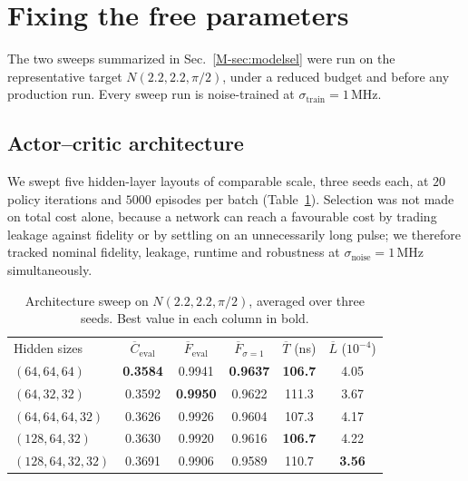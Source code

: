 \documentclass[aps,prx,twocolumn,superscriptaddress,nofootinbib,amsmath,amssymb,floatfix]{revtex4-2}
\newcommand{\Ntgt}[2]{N(#1,#1,#2)}
\newcommand{\Fbar}{\overline{F}}
\newcommand{\snoise}{\sigma_{\mathrm{noise}}}
\newcommand{\strain}{\sigma_{\mathrm{train}}}
\newcommand{\MHz}{\,\mathrm{MHz}}
\begin{document}
\section{Fixing the free parameters}
\label{app:modelsel}

The two sweeps summarized in Sec.~\ref{M-sec:modelsel} were run on the representative target
$\Ntgt{2.2}{\pi/2}$, under a reduced budget and before any production run. Every sweep run is
noise-trained at $\strain=1\MHz$.

\subsection{Actor--critic architecture}
\label{sec:arch}

We swept five hidden-layer layouts of comparable scale, three seeds each, at $20$ policy iterations and
$5000$ episodes per batch (Table~\ref{tab:arch}). Selection was not made on total cost alone, because
a network can reach a favourable cost by trading leakage against fidelity or by settling on an
unnecessarily long pulse; we therefore tracked nominal fidelity, leakage, runtime and robustness at
$\snoise=1\MHz$ simultaneously.

\begin{table}[t]
\caption{Architecture sweep on $\Ntgt{2.2}{\pi/2}$, averaged over three seeds. Best value in each
column in bold.}
\label{tab:arch}
\begin{ruledtabular}
\begin{tabular}{lccccc}
Hidden sizes & $\overline{C}_{\mathrm{eval}}$ & $\overline{F}_{\mathrm{eval}}$ & $\Fbar_{\sigma=1}$ & $\overline{T}$ (ns) & $\overline{L}$ ($10^{-4}$)\\
\colrule
$(64,64,64)$      & \textbf{0.3584} & 0.9941          & \textbf{0.9637} & \textbf{106.7} & 4.05 \\
$(64,32,32)$      & 0.3592          & \textbf{0.9950} & 0.9622          & 111.3          & 3.67 \\
$(64,64,64,32)$   & 0.3626          & 0.9926          & 0.9604          & 107.3          & 4.17 \\
$(128,64,32)$     & 0.3630          & 0.9920          & 0.9616          & \textbf{106.7} & 4.22 \\
$(128,64,32,32)$  & 0.3691          & 0.9906          & 0.9589          & 110.7          & \textbf{3.56} \\
\end{tabular}
\end{ruledtabular}
\end{table}
\end{document}
